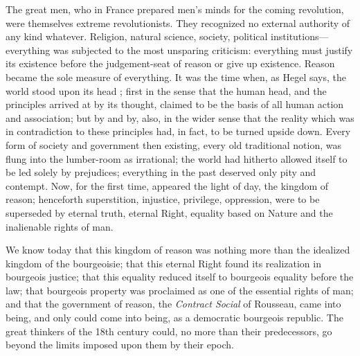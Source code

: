 \documentclass[oneside, 12pt]{book}
\begin{document}
The great men, who in France prepared men's minds for the coming revolution,
were themselves extreme revolutionists. They recognized no external authority of
any kind whatever. Religion, natural science, society, political
institutions---everything was subjected to the most unsparing criticism:
everything must justify its existence before the judgement-seat of reason or
give up existence. Reason became the sole measure of everything. It was the time
when, as Hegel says, the world stood upon its head%
; first in the sense that the human head, and the principles arrived at by its
thought, claimed to be the basis of all human action and association; but by
and by, also, in the wider sense that the reality which was in contradiction to
these principles had, in fact, to be turned upside down. Every form of society
and government then existing, every old traditional notion, was flung into the
lumber-room as irrational; the world had hitherto allowed itself to be led
solely by prejudices; everything in the past deserved only pity and contempt.
Now, for the first time, appeared the light of day, the kingdom of reason;
henceforth superstition, injustice, privilege, oppression, were to be superseded
by eternal truth, eternal Right, equality based on Nature and the inalienable
rights of man.

We know today that this kingdom of reason was nothing more than the idealized
kingdom of the bourgeoisie; that this eternal Right found its realization in
bourgeois justice; that this equality reduced itself to bourgeois equality
before the law; that bourgeois property was proclaimed as one of the essential
rights of man; and that the government of reason, the \emph{Contract Social} of
Rousseau, came into being, and only could come into being, as a democratic
bourgeois republic. The great thinkers of the 18th century could, no more than
their predecessors, go beyond the limits imposed upon them by their epoch.
\end{document}

